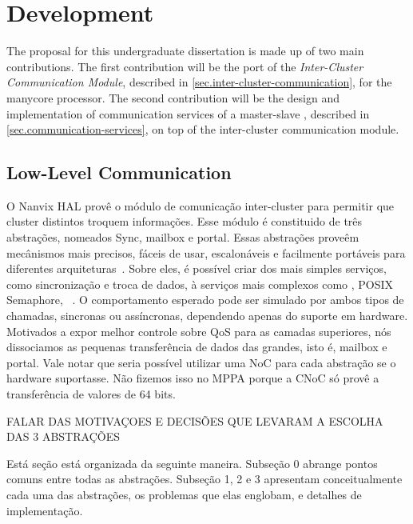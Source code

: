 \chapter{Development}
\label{ch.development}


	The proposal for this undergraduate dissertation is made up of two main contributions.
	The first contribution will be the port of the \textit{Inter-Cluster Communication Module},
	described in \autoref{sec.inter-cluster-communication}, for the \mppa manycore processor.
	The second contribution will be the design and implementation of communication services
	of a master-slave \os, described in \autoref{sec.communication-services}, on top of
	the inter-cluster communication module.


	\section{Low-Level Communication}
	\label{sec.low-level-comm}

		O Nanvix HAL provê o módulo de comunicação inter-cluster para permitir que cluster distintos troquem informações.
		Esse módulo é constituido de três abstrações, nomeados Sync, mailbox e portal.
		Essas abstrações proveêm mecânismos mais precisos, fáceis de usar, escalonáveis e facilmente portáveis para diferentes arquiteturas~\cite{wentzlaff_fleets:_2011}.
		Sobre eles, é possível criar dos mais simples serviços, como sincronização e troca de dados, à serviços mais complexos como \shm, POSIX Semaphore, \rmem~\cite{penna:rmen}.
		O comportamento esperado pode ser simulado por ambos tipos de chamadas, sincronas ou assíncronas, dependendo apenas do suporte em hardware.
		Motivados a expor melhor controle sobre QoS para as camadas superiores, nós dissociamos as pequenas transferência de dados das grandes, isto é, mailbox e portal.
		Vale notar que seria possível utilizar uma NoC para cada abstração se o hardware suportasse.
		Não fizemos isso no MPPA porque a CNoC só provê a transferência de valores de 64 bits.

		FALAR DAS MOTIVAÇOES E DECISÕES QUE LEVARAM A ESCOLHA DAS 3 ABSTRAÇÕES

		Está seção está organizada da seguinte maneira.
		Subseção 0 abrange pontos comuns entre todas as abstrações.
		Subseção 1, 2 e 3 apresentam conceitualmente cada uma das abstrações, os problemas que elas englobam, e detalhes de implementação.

